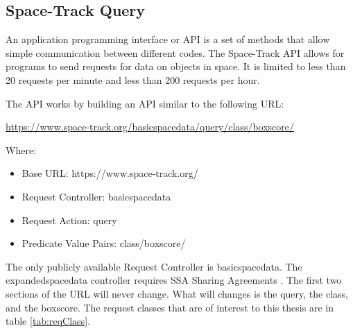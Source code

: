\documentclass[12pt]{article}
\begin{document}
	\subsection{Space-Track Query}
	An application programming interface or API is a set of methods that allow simple communication between different codes. The Space-Track API allows for programs to send requests for data on objects in space. It is limited to less than 20 requests per minute and less than 200 requests per hour. 
	
	
	The API works by building an API similar to the following URL:
	
	\url{https://www.space-track.org/basicspacedata/query/class/boxscore/} 
	
	Where: 

	\begin{itemize}	\singlespacing
		\item Base URL: https://www.space-track.org/
		
		\item Request Controller: basicspacedata
		\item Request Action: query
		\item Predicate Value Pairs: class/boxscore/
	\end{itemize}
\doublespacing
The only publicly available Request Controller is basicspacedata. The expandedspacedata controller requires SSA Sharing Agreements \cite{SpaceTrackAPI}. The first two sections of the URL will never change. What will changes is the query, the class, and the boxscore. The request classes that are of interest to this thesis are in table \ref{tab:reqClass}.\par
\end{document}
